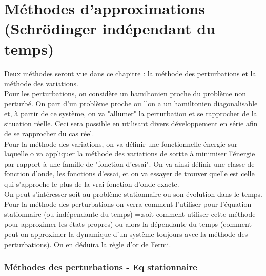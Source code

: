\chapter{Méthodes d'approximations (Schrödinger indépendant du temps)}
Deux méthodes seront vue dans ce chapitre : la méthode des perturbations 
et la méthode des variations. \\

Pour les perturbations, on considère un hamiltonien proche du problème non perturbé. 
On part d'un problème proche ou l'on a un hamiltonien diagonalisable et, à partir de 
ce système, on va "allumer" la perturbation et se rapprocher de la situation réelle. 
Ceci sera possible en utilisant divers développement en série afin de se rapprocher 
du cas réel.\\

Pour la méthode des variations, on va définir une fonctionnelle énergie sur laquelle 
o va appliquer la méthode des variations de sortte à minimiser l'énergie par rapport 
à une famille de "fonction d'essai". On va ainsi définir une classe de fonction d'onde, 
les fonctions d'essai, et on va essayer de trouver quelle est celle qui s'approche le 
plus de la vrai fonction d'onde exacte. \\

On peut s'intéresser soit au problème stationnaire ou son évolution dans le temps. Pour 
la méthode des perturbations on verra comment l'utiliser pour l'équation stationnaire 
(ou indépendante du temps) =:soit comment utiliser cette méthode pour approximer les états 
propres) ou alors la dépendante du temps (comment peut-on approximer la dynamique d'un 
système toujours avec la méthode des perturbations). On en déduira la règle d'or de Fermi. 

	\subsection{Méthodes des perturbations - Eq stationnaire}
